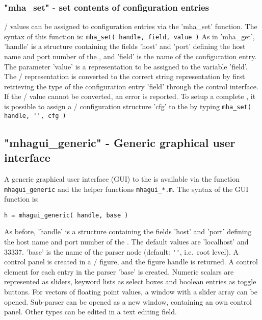\subsubsection{"mha\_set" - set contents of \mha{} configuration entries}

\Octave{}/ \Matlab{} values can be assigned to \mha{} configuration entries via the
'mha\_set' function.
%
The syntax of this function is:
\verb!mha_set( handle, field, value )!
%
As in 'mha\_get', 'handle' is a structure containing the fields 'host'
and 'port' defining the host name and port number of the \mhad{}, and
'field' is the name of the \mha{} configuration entry.
%
The parameter 'value' is a \Matlab{} representation to be assigned to
the variable 'field'.
%
The \Octave{}/ \Matlab{} representation is converted to the correct \mha{} string
representation by first retrieving the type of the configuration entry
'field' through the control interface.
%
If the \Octave{}/ \Matlab{} value cannot be converted, an error is reported.
%
To setup a complete \mha{}, it is possible to assign a \Octave{}/ \Matlab{}
configuration structure 'cfg' to the \mha{} by typing
\verb!mha_set( handle, '', cfg )!

\subsection{"mhagui\_generic" - Generic graphical user interface}
\label{sec:mhagui_generic}

A generic graphical user interface (GUI) to the \mhad{} is available
via the function \verb!mhagui_generic! and the helper functions
\verb!mhagui_*.m!.
%
The syntax of the GUI function is:
\begin{verbatim}
h = mhagui_generic( handle, base )
\end{verbatim}
%
As before, 'handle' is a structure containing the fields 'host' and
'port' defining the host name and port number of the \mhad{}. The
default values are 'localhost' and 33337.
%
'base' is the name of the \mha{} parser node (default: \verb!''!, i.e.\ root level).
%
A control panel is created in a \Octave{}/ \Matlab{} figure, and the figure
handle is returned.
%
A control element for each entry in the parser 'base' is created.
%
Numeric scalars are represented as sliders, keyword lists as select
boxes and boolean entries as toggle buttons.
%
For vectors of floating point values, a window with a slider array can
be opened.
%
Sub-parser can be opened as a new window, containing an own control
panel.
%
Other types can be edited in a text editing field.

